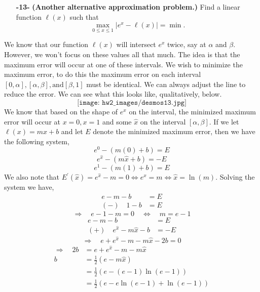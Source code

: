 \documentclass[11pt]{article}
\theoremstyle{definition}
\newcommand{\1}[1]{\mathbf{1} \left \{ #1 \right \}}
\begin{document}
\begin{itemize}
    \item[{\textbf{-13-}}] \textbf{(Another alternative approximation problem.)}  Find a linear function $\ell(x)$ such that
    \begin{equation}
        \max_{0 \leq x \leq 1} |e^x - \ell(x)| = \min.
    \end{equation}
\end{itemize}
We know that our function $\ell(x)$ will intersect $e^x$ twice, say at $\alpha$ and $\beta$.  However, we won't focus on these values all that much.  The idea is that the maximum error will occur at one of these intervals.  We wish to minimize the maximum error, to do this the maximum error on each interval \([0, \alpha], [\alpha, \beta], \text{and} [\beta, 1]\) must be identical.  We can always adjust the line to reduce the error.  We can see what this looks like, qualitatively, below.
\[\texttt{[image: hw2\_images/desmos13.jpg]}\]
We know that based on the shape of $e^x$ on the interval, the minimized maximum error will occur at $x=0, x=1$ and some $\hat{x}$ on the interval $[\alpha, \beta]$.  If we let $\ell(x) = mx+b$ and let $E$ denote the minimized maximum error, then we have the following system,
\[e^0 - (m(0) + b) = E\]
\[e^{\hat{x}} - (m\hat{x} + b) = -E\]
\[e^1 - (m(1) + b) = E\]
We also note that \(E^{\prime}(\hat{x}) = e^{\hat{x}} - m = 0 \Leftrightarrow e^{\hat{x}} = m \Leftrightarrow \hat{x} = \ln (m)\).  Solving the system we have,
\begin{align*}
    e - m - b &= E \\
    (-) \quad 1 - b &= E
\end{align*}
\[\Longrightarrow \quad e - 1 - m = 0 \quad \Longleftrightarrow \quad m = e - 1\]
\begin{align*}
    e - m - b &= E \\
    (+) \quad e^{\hat{x}} - m\hat{x} - b &= -E
\end{align*}
\[\Longrightarrow \quad e + e^{\hat{x}} - m - m\hat{x} - 2b = 0 \]
\begin{equation*}
    \begin{split}
        \Longrightarrow \quad 2b &= e + e^{\hat{x}} - m - m\hat{x} \\
        b &= \frac{1}{2}\left(e - m\hat{x}\right) \\
        &= \frac{1}{2}\left(e - (e - 1)\ln(e - 1)\right) \\
        &= \frac{1}{2}\left(e - e\ln(e - 1) + \ln(e - 1)\right)
    \end{split}
\end{equation*}
\end{document}
